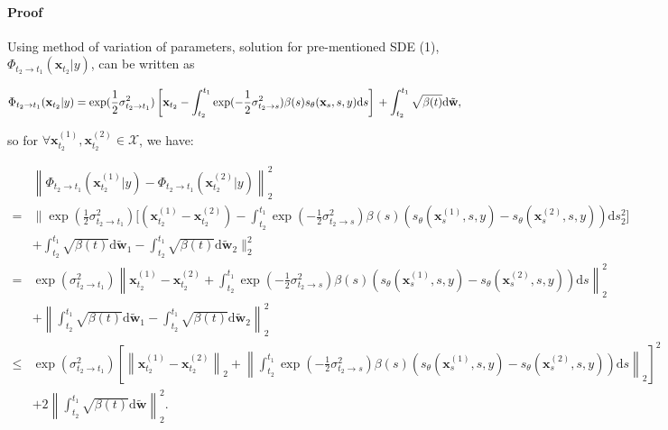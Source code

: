 \paragraph{Proof}
Using method of variation of parameters, solution for pre-mentioned SDE (1), $\Phi_{t_2\rightarrow t_1}(\mathbf{x}_{t_2} \vert y)$, can be written as

\begin{equation}
\Phi_{t_2\rightarrow t_1}(\mathbf{x}_{t_2} \vert y)\\
=\exp(\frac{1}{2}\sigma^2_{t_2 \rightarrow t_1})\left[\mathbf{x}_{t_2}
-\int_{t_2}^{t_1}\exp(-\frac{1}{2}\sigma^2_{t_2 \rightarrow s})\beta(s)s_{\theta}(\mathbf{x}_{s},s,y)\textrm{d}s\right]\\
+\int_{t_2}^{t_1}\sqrt{\beta( t )} \textrm{d} \tilde{\mathbf{w}},
\end{equation}

so for $\forall \mathbf{x}_{t_2}^{(1)}, \mathbf{x}_{t_2}^{(2)} \in \mathcal{X}$, we have: 

\begin{equation}
\begin{aligned}
& \left\| \Phi_{t_2\rightarrow t_1}\left(\mathbf{x}_{t_2}^{(1)} \vert y\right)-\Phi_{t_2\rightarrow t_1}\left(\mathbf{x}_{t_2}^{(2)} \vert y\right) \right\|_2^2 \\
= & \|\exp(\frac{1}{2}\sigma^2_{t_2 \rightarrow t_1})\Big[(\mathbf{x}_{t_2}^{(1)}-\mathbf{x}_{t_2}^{(2)})-\int_{t_2}^{t_1}\exp(-\frac{1}{2}\sigma^2_{t_2 \rightarrow s})\beta(s)(s_{\theta}(\mathbf{x}_{s}^{(1)},s,y)-s_{\theta}(\mathbf{x}_{s}^{(2)},s,y))\textrm{d}s_2^2\Big] \\
& +\int_{t_2}^{t_1}\sqrt{\beta( t )} \textrm{d} \tilde{\mathbf{w}}_1-\int_{t_2}^{t_1}\sqrt{\beta( t )} \textrm{d} \tilde{\mathbf{w}}_2\|_2^2 \\
= &\exp(\sigma^2_{t_2 \rightarrow t_1})\left\|\mathbf{x}_{t_2}^{(1)}-\mathbf{x}_{t_2}^{(2)}+\int_{t_2}^{t_1}\exp(-\frac{1}{2}\sigma^2_{t_2 \rightarrow s})\beta(s)(s_{\theta}(\mathbf{x}_{s}^{(1)},s,y)-s_{\theta}(\mathbf{x}_{s}^{(2)},s,y))\textrm{d}s\right\|_2^2  \\
&+\left\|\int_{t_2}^{t_1}\sqrt{\beta( t )} \textrm{d} \tilde{\mathbf{w}}_1-\int_{t_2}^{t_1}\sqrt{\beta( t )} \textrm{d} \tilde{\mathbf{w}}_2\right\|_2^2 \\
\leq &\exp(\sigma^2_{t_2 \rightarrow t_1})\left[  \left\|\mathbf{x}_{t_2}^{(1)}-\mathbf{x}_{t_2}^{(2)}\right\|_2+\left\|\int_{t_2}^{t_1}\exp(-\frac{1}{2}\sigma^2_{t_2 \rightarrow s})\beta(s)(s_{\theta}(\mathbf{x}_{s}^{(1)},s,y)-s_{\theta}(\mathbf{x}_{s}^{(2)},s,y))\textrm{d}s\right\|_2\right]^2  \\
& +2\left\|\int_{t_2}^{t_1}\sqrt{\beta( t )} \textrm{d} \tilde{\mathbf{w}}\right\|_2^2.
\end{aligned}
\end{equation}


